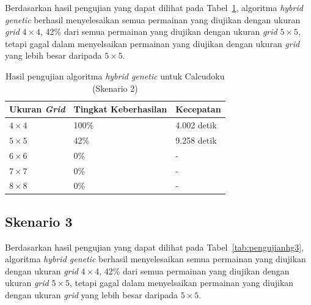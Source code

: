 Berdasarkan hasil pengujian yang dapat dilihat pada Tabel~\ref{tab:pengujianhg2}, algoritma \textit{hybrid genetic} berhasil menyelesaikan semua permainan yang diujikan dengan ukuran \textit{grid} \begin{math}4 \times 4\end{math}, 42\% dari semua permainan yang diujikan dengan ukuran \textit{grid} \begin{math}5 \times 5\end{math}, tetapi gagal dalam menyelsaikan permainan yang diujikan dengan ukuran \textit{grid} yang lebih besar daripada \begin{math}5 \times 5\end{math}.

\begin{table}
\centering
\captionsetup{justification=centering}
\caption[Hasil pengujian algoritma \textit{hybrid genetic} untuk Calcudoku (Skenario 2)]{Hasil pengujian algoritma \textit{hybrid genetic} untuk Calcudoku (Skenario 2)}
\begin{tabular}{| l | l | l |}
\hline
Ukuran \textit{Grid} & Tingkat Keberhasilan & Kecepatan \\
\hline \hline
\begin{math}4 \times 4\end{math} & 100\% & 4.002 detik \\
\hline
\begin{math}5 \times 5\end{math} & 42\% & 9.258 detik \\
\hline
\begin{math}6 \times 6\end{math} & 0\% & - \\
\hline
\begin{math}7 \times 7\end{math} & 0\% & - \\
\hline
\begin{math}8 \times 8\end{math} & 0\% & - \\
\hline
\end{tabular}
\label{tab:pengujianhg2}
\end{table}

\subsection{Skenario 3}
\label{sec:skenario3}

Berdasarkan hasil pengujian yang dapat dilihat pada Tabel~\ref{tab:pengujianhg3}, algoritma \textit{hybrid genetic} berhasil menyelesaikan semua permainan yang diujikan dengan ukuran \textit{grid} \begin{math}4 \times 4\end{math}, 42\% dari semua permainan yang diujikan dengan ukuran \textit{grid} \begin{math}5 \times 5\end{math}, tetapi gagal dalam menyelsaikan permainan yang diujikan dengan ukuran \textit{grid} yang lebih besar daripada \begin{math}5 \times 5\end{math}.

